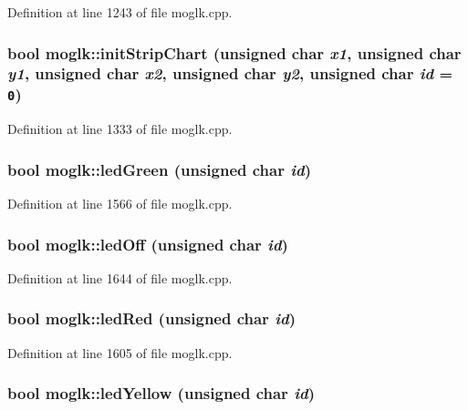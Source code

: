 Definition at line 1243 of file moglk.cpp.\hypertarget{classmoglk_34c40a476ff9cfd4342c0990dc3fd827}{
\subsubsection[{initStripChart}]{\setlength{\rightskip}{0pt plus 5cm}bool moglk::initStripChart (unsigned char {\em x1}, \/  unsigned char {\em y1}, \/  unsigned char {\em x2}, \/  unsigned char {\em y2}, \/  unsigned char {\em id} = {\tt 0})}}
\label{classmoglk_34c40a476ff9cfd4342c0990dc3fd827}




Definition at line 1333 of file moglk.cpp.\hypertarget{classmoglk_355677082e83cae9f360be695a4ad5bf}{
\subsubsection[{ledGreen}]{\setlength{\rightskip}{0pt plus 5cm}bool moglk::ledGreen (unsigned char {\em id})}}
\label{classmoglk_355677082e83cae9f360be695a4ad5bf}




Definition at line 1566 of file moglk.cpp.\hypertarget{classmoglk_f04915ee646e076725185334596ac586}{
\subsubsection[{ledOff}]{\setlength{\rightskip}{0pt plus 5cm}bool moglk::ledOff (unsigned char {\em id})}}
\label{classmoglk_f04915ee646e076725185334596ac586}




Definition at line 1644 of file moglk.cpp.\hypertarget{classmoglk_9ddc6b3f833eff3fe4abc3c80ec6e0a1}{
\subsubsection[{ledRed}]{\setlength{\rightskip}{0pt plus 5cm}bool moglk::ledRed (unsigned char {\em id})}}
\label{classmoglk_9ddc6b3f833eff3fe4abc3c80ec6e0a1}




Definition at line 1605 of file moglk.cpp.\hypertarget{classmoglk_f21d21869ca65ab294c0666b1c0690f3}{
\subsubsection[{ledYellow}]{\setlength{\rightskip}{0pt plus 5cm}bool moglk::ledYellow (unsigned char {\em id})}}
\label{classmoglk_f21d21869ca65ab294c0666b1c0690f3}




